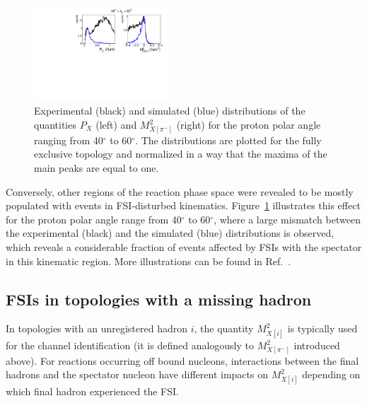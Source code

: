 \documentclass[prc,twocolumn,superscriptaddress,showpacs,amssymb,amsmath,amsfonts,aps,nofootinbib]{revtex4-1}
\begin{document}
\begin{figure}[htp]
\begin{center}
\includegraphics[width=0.45\textwidth]{pictures/fsi/fsi2.pdf}
\caption{\small Experimental (black) and simulated (blue) distributions of the quantities $P_{X}$ (left) and $M^{2}_{X[\pi^{-}]}$ (right) for the proton polar angle ranging from 40$^{\circ}$ to 60$^{\circ}$. The distributions are plotted for the fully exclusive topology and normalized in a way that the maxima of the main peaks are equal to one.} \label{fig:fsi_pr_ang}
\end{center}
\end{figure}

Conversely, other regions of the reaction phase space were revealed to be mostly populated with events in FSI-disturbed kinematics. Figure~\ref{fig:fsi_pr_ang} illustrates this effect for the proton polar angle range from 40$^{\circ}$ to 60$^{\circ}$, where a large mismatch between the experimental (black) and the simulated (blue) distributions is observed, which reveals a considerable fraction of events affected by FSIs with the spectator in this kinematic region. More illustrations can be found in Ref.\!~\cite{my_thesis:2021}.



\subsection{FSIs in topologies with a missing hadron}
\label{sect:fsi_top_miss}

In topologies with an unregistered hadron $i$, the quantity $M^{2}_{X[i]}$ is typically used for the channel identification (it is defined analogously to $M^{2}_{X[\pi^{-}]}$ introduced above). For reactions occurring off bound nucleons, interactions between the final hadrons and the spectator nucleon have different impacts on $M^{2}_{X[i]}$ depending on which final hadron experienced the FSI.
\end{document}
